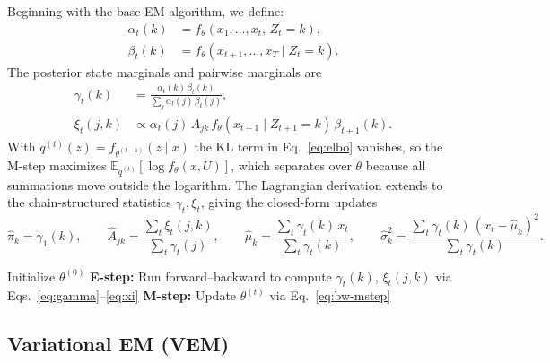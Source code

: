 \documentclass{article}
\newcommand{\E}{\mathbb{E}}
\newcommand{\KL}{\mathrm{KL}}
\begin{document}
Beginning with the base EM algorithm, we define:
\begin{align}
  \alpha_t(k) & = f_\theta(x_1, \ldots, x_t,\, Z_t = k),       \\
  \beta_t(k)  & = f_\theta(x_{t+1}, \ldots, x_T \mid Z_t = k).
\end{align}
The posterior state marginals and pairwise marginals are
\begin{align}
  \gamma_t(k) & = \frac{\alpha_t(k)\,\beta_t(k)}{\sum_j \alpha_t(j)\,\beta_t(j)},
  \label{eq:gamma}                                                                             \\
  \xi_t(j, k) & \propto \alpha_t(j)\,A_{jk}\,f_\theta(x_{t+1} \mid Z_{t+1}=k)\,\beta_{t+1}(k).
  \label{eq:xi}
\end{align}
With $q^{(t)}(z) = f_{\theta^{(t-1)}}(z \mid x)$ the $\KL$ term in
Eq.~\eqref{eq:elbo} vanishes, so the M-step maximizes
$\E_{q^{(t)}}[\log f_\theta(x, U)]$, which separates over $\theta$
because all summations move outside the logarithm. The Lagrangian derivation extends
to the chain-structured statistics $\gamma_t, \xi_t$, giving the
closed-form updates
\begin{equation}
  \hat\pi_k = \gamma_1(k), \qquad
  \hat A_{jk} = \frac{\sum_t \xi_t(j,k)}{\sum_t \gamma_t(j)}, \qquad
  \hat\mu_k = \frac{\sum_t \gamma_t(k)\,x_t}{\sum_t \gamma_t(k)}, \qquad
  \hat\sigma_k^2 = \frac{\sum_t \gamma_t(k)\,(x_t - \hat\mu_k)^2}{\sum_t \gamma_t(k)}.
  \label{eq:bw-mstep}
\end{equation}

\begin{algorithm}[ht]
  \caption{Base EM (Baum--Welch)}
  \begin{algorithmic}[1]
    \State Initialize $\theta^{(0)}$
    \Repeat
    \State \textbf{E-step:} Run forward--backward to compute
    $\gamma_t(k)$, $\xi_t(j,k)$ via Eqs.~\eqref{eq:gamma}--\eqref{eq:xi}
    \State \textbf{M-step:} Update $\theta^{(t)}$ via Eq.~\eqref{eq:bw-mstep}
  \end{algorithmic}
\end{algorithm}

\subsection{Variational EM (VEM)}
\end{document}
